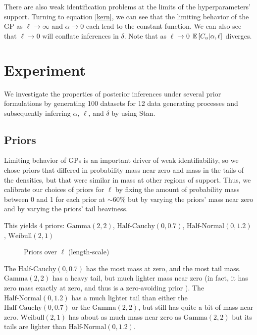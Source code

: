 \documentclass{article}
\newcommand{\Exp}[1]{\ensuremath{\mathbb{E} \lb #1 \rb}}
\newcommand{\lb}{\ensuremath{\left[}}
\newcommand{\rb}{\ensuremath{\right]}}
\begin{document}
There are also weak identification problems at the limits of the
hyperparameters' support. Turning to equation \ref{kern}, we can see that
the limiting behavior of the GP as $\ell \rightarrow \infty$ and $\alpha
\rightarrow 0$ each lead to the constant function. We can also see that $\ell
\rightarrow 0$ will conflate inferences in $\delta$.  Note that as $\ell
\rightarrow 0$ $\Exp{C_u | \alpha, \ell}$ diverges.

\section{Experiment} \label{experiment}

We investigate the properties of posterior inferences under several prior
formulations by generating 100 datasets for 12 data generating processes and
subsequently inferring $\alpha$, $\ell$, and $\delta$ by using Stan.

\subsection{Priors}

Limiting behavior of GPs is an important driver of weak identifiability, so we
chose priors that differed in probability mass near zero and mass
in the tails of the densities, but that were similar in mass at other regions
of support. Thus, we calibrate our choices of priors for $\ell$ by fixing the
amount of probability mass between 0 and 1 for each prior at $\sim60\%$ but by
varying the priors' mass near zero and by varying the priors' tail heaviness.

This yields 4 priors: $\text{Gamma}(2, 2)$, $\text{Half-Cauchy}(0, 0.7)$,
$\text{Half-Normal}(0, 1.2)$, $\text{Weibull}(2, 1)$
\begin{figure}[t] 
  \caption{Priors over $\ell$ (length-scale)} \label{prior_plot}
\end{figure}
The $\text{Half-Cauchy}(0, 0.7)$ has the most mass at zero, and the most tail
mass. $\text{Gamma}(2, 2)$ has a heavy tail, but much lighter mass near zero
(in fact, it has zero mass exactly at zero, and thus is a zero-avoiding prior
\citet{gelman2014bayesian}). The $\text{Half-Normal}(0, 1.2)$ has a much
lighter tail than either the $\text{Half-Cauchy}(0, 0.7)$ or the
$\text{Gamma}(2, 2)$, but still has quite a bit of mass near zero.
$\text{Weibull}(2, 1)$ has about as much mass near zero as $\text{Gamma}(2, 2)$
but its tails are lighter than $\text{Half-Normal}(0, 1.2)$.
\end{document}

